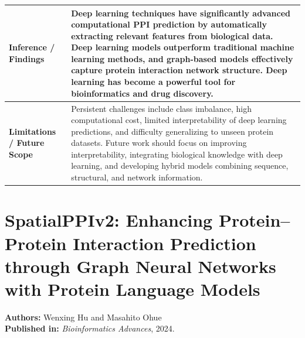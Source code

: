 \documentclass[12pt,a4paper]{report}
\begin{document}
\begin{table}[H]
\centering
\renewcommand{\arraystretch}{1.5}
\begin{tabular}{|p{}|p{}|}
\hline
\textbf{Inference / Findings} & Deep learning techniques have significantly advanced computational PPI prediction by automatically extracting relevant features from biological data. Deep learning models outperform traditional machine learning methods, and graph-based models effectively capture protein interaction network structure. Deep learning has become a powerful tool for bioinformatics and drug discovery. \\ \hline
\textbf{Limitations / Future Scope} & Persistent challenges include class imbalance, high computational cost, limited interpretability of deep learning predictions, and difficulty generalizing to unseen protein datasets. Future work should focus on improving interpretability, integrating biological knowledge with deep learning, and developing hybrid models combining sequence, structural, and network information. \\ \hline
\end{tabular}
\end{table}

\newpage

\section{SpatialPPIv2: Enhancing Protein–Protein Interaction Prediction through Graph Neural Networks with Protein Language Models}
\textbf{Authors:} Wenxing Hu and Masahito Ohue \\
\textbf{Published in:} \textit{Bioinformatics Advances}, 2024.
\end{document}
